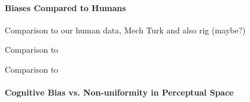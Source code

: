 

\paragraph{Biases Compared to Humans}

Comparison to our human data, Mech Turk and also rig (maybe?)

Comparison to \cite{bae_why_2015}

Comparison to \cite{panichello_error-correcting_2019}

\paragraph{Cognitive Bias vs. Non-uniformity in Perceptual Space}


